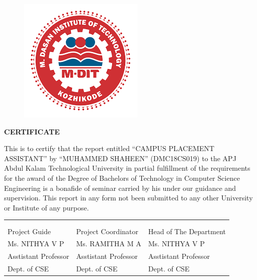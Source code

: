 \documentclass[12pt]{article}
\begin{document}
\begin{changemargin}{0.5cm}{0.5cm}
\begin{figure}[H]
\begin{center}
\includegraphics[scale=.4]{MDIT}
\end{center} 
\end{figure}
\begin{center}\LARGE\bf{CERTIFICATE} \end{center}
\vspace{5mm}
\justifying
This is to certify that the report entitled “CAMPUS PLACEMENT ASSISTANT” by  “MUHAMMED SHAHEEN” (DMC18CS019) to the APJ Abdul Kalam Technological University in partial fulfillment of the requirements for the award of the Degree of Bachelors of Technology in Computer Science Engineering is a bonafide of seminar carried by his under our guidance and supervision. This report in any form not been submitted to any other University or Institute of any purpose.
\thispagestyle{empty}
\begin{center}
\begin{tabularx}{1\textwidth} { 
  >{\raggedright\arraybackslash}X 
   >{\raggedright\arraybackslash}X 
   >{\raggedright\arraybackslash}X }
 
\\  \\ \\ 

Project Guide & Project Coordinator & Head of The Department  \\  

Ms. NITHYA V P  & Ms. RAMITHA M A & Ms. NITHYA V P \\ 

Asstistant Professor & Asstistant Professor &Asstistant Professor \\  

Dept. of CSE & Dept. of CSE & Dept. of CSE   


\end{tabularx}
\end{center}


\end{changemargin}
\end{document}
